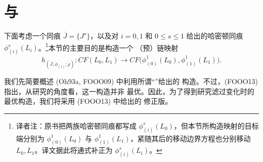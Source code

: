 \section{\termChainMapModuliSpace{}与\termEnergyEstimate{}}
\label{sec:chain-map-moduli-energy-estimates}

下面考虑一个同痕 $\overline J=\{J^s\}$，以及对 $i=0,1$ 和
$0\leq s\leq1$ 给出的哈密顿同痕
$\phi_{(i)}^s(L_i)$。\footnote{译者注：原书把两族哈密顿同痕都写成
$\phi_{(i)}^s(L_0)$，但本节所构造映射的目标端分别为
$\phi_{(0)}^1(L_0)$ 与 $\phi_{(1)}^1(L_1)$，紧随其后的移动边界方程也分别移动
$L_0,L_1$。译文据此将通式补正为 $\phi_{(i)}^s(L_i)$。}本节的主要目的是构造一个
（预）链映射
\begin{equation}
  h_{(\overline J,\phi_{(i)};\rho)}:
  CF(L_0,L_1)
  \longrightarrow
  CF\bigl(\phi_{(0)}^1(L_0),\phi_{(1)}^1(L_1)\bigr).
\label{eq:chain-map-under-isotopy}
\end{equation}

我们先简要概述 (Oh93a, FOOO09) 中利用所谓“\termMovingBoundaryCondition{}”给出的
构造。不过，(FOOO13) 指出，从研究\termFiltrationChange{}的角度看，这一构造并非
最优。因此，为了得到研究滤过变化时的最优构造，我们将采用 (FOOO13) 中给出的
修正版。

